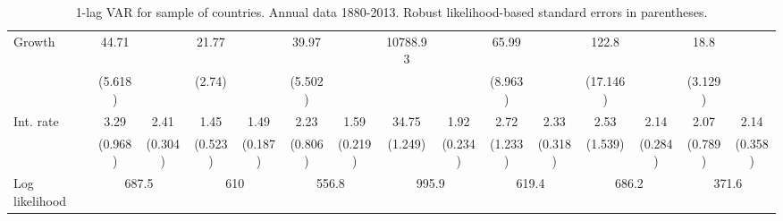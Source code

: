 \begin{table}[htbp]
\begin{tabular}{@{\extracolsep{4pt}}lcccccccccccccc@{}}
\quad Growth 	 &44.71 	 &  	 & 21.77 	 &  	 & 39.97 	 &  	 & 10788.93 	 &  	 & 65.99 	 &  	 & 122.8 	 &  	 & 18.8 	 & 	 \\ 
 		 & (5.618) 	 &  	 & (2.74) 	 &  	 & (5.502) 	 &  	 &  	 &  	 & (8.963) 	 &  	 & (17.146) 	 &  	 & (3.129) 	 &  	 \\ 
\quad Int. rate 	 &3.29 	 & 2.41 	 & 1.45 	 & 1.49 	 & 2.23 	 & 1.59 	 & 34.75 	 & 1.92 	 & 2.72 	 & 2.33 	 & 2.53 	 & 2.14 	 & 2.07 	 & 2.14	 \\ 
 		 & (0.968) 	 & (0.304) 	 & (0.523) 	 & (0.187) 	 & (0.806) 	 & (0.219) 	 & (1.249) 	 & (0.234) 	 & (1.233) 	 & (0.318) 	 & (1.539) 	 & (0.284) 	 & (0.789) 	 & (0.358) 	 \\ 
 \hline \rule{0pt}{4ex} 
  Log likelihood 	 &\multicolumn{2}{c}{687.5} 	 & \multicolumn{2}{c}{610} 	 & \multicolumn{2}{c}{556.8} 	 & \multicolumn{2}{c}{995.9} 	 & \multicolumn{2}{c}{619.4} 	 & \multicolumn{2}{c}{686.2} 	 & \multicolumn{2}{c}{371.6}\\ 

 \hline 	\end{tabular}		\caption{1-lag VAR for sample of countries. Annual data 1880-2013. Robust likelihood-based standard errors in parentheses.}
		\label{tab:all_1lag}

\end{table}